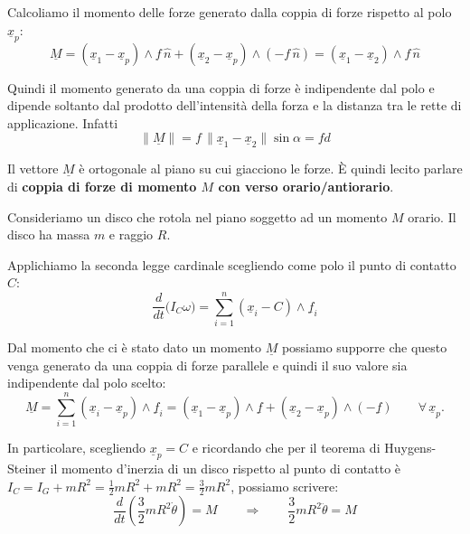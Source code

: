 Calcoliamo il momento delle forze generato dalla coppia di forze rispetto al polo $\underline{x}_p$:
\[
\underline{M}
=
(\underline{x}_1-\underline{x}_p)\wedge f\,\hat n
+
(\underline{x}_2-\underline{x}_p)\wedge (-f\,\hat n)
=
(\underline{x}_1-\underline{x}_2)\wedge f\,\hat n
\]

Quindi il momento generato da una coppia di forze è indipendente dal polo e dipende soltanto dal prodotto dell'intensità della forza e la distanza tra le rette di applicazione. Infatti
\[
\|\underline{M}\| = f\,\|\underline{x}_1-\underline{x}_2\|\sin\alpha = fd
\]

Il vettore $\underline{M}$ è ortogonale al piano su cui giacciono le forze.
È quindi lecito parlare di \textbf{coppia di forze di momento $M$ con verso orario/antiorario}.

\begin{example}{}
Consideriamo un disco che rotola nel piano soggetto ad un momento $M$ orario. Il disco ha massa $m$ e raggio $R$.

\begin{figure}
\centering
{}
\end{figure}

Applichiamo la seconda legge cardinale scegliendo come polo il punto di contatto $C$:
\[
\frac{d}{dt}\bigl(I_C\omega\bigr)=\sum_{i=1}^{n}(\underline{x}_i-C)\wedge \underline{f}_i
\]

Dal momento che ci è stato dato un momento $\underline{M}$ possiamo supporre che questo venga generato da una coppia di forze parallele e quindi il suo valore sia indipendente dal polo scelto:
\[
\underline{M}
=
\sum_{i=1}^{n}(\underline{x}_i-\underline{x}_p)\wedge \underline{f}_i
=
(\underline{x}_1-\underline{x}_p)\wedge \underline{f}
+
(\underline{x}_2-\underline{x}_p)\wedge (-\underline{f})
\qquad \forall\,\underline{x}_p.
\]

In particolare, scegliendo $\underline{x}_p=C$ e ricordando che per il teorema di Huygens-Steiner il momento d'inerzia di un disco rispetto al punto di contatto è $I_C = I_G + mR^2 = \frac{1}{2}mR^2 + mR^2 = \frac{3}{2}mR^2$, possiamo scrivere:
\[
\frac{d}{dt}\left(\frac{3}{2}mR^2\dot{\theta}\right)=M
\qquad \Longrightarrow \qquad
\frac{3}{2}mR^2\ddot{\theta}=M
\]
\end{example}
